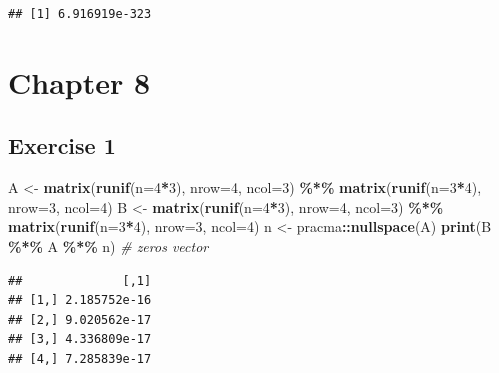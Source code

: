 \documentclass[
]{book}
\newenvironment{Shaded}{\begin{snugshade}}{\end{snugshade}}
\newcommand{\CommentTok}[1]{\textcolor[rgb]{0.56,0.35,0.01}{\textit{#1}}}
\newcommand{\DataTypeTok}[1]{\textcolor[rgb]{0.13,0.29,0.53}{#1}}
\newcommand{\DecValTok}[1]{\textcolor[rgb]{0.00,0.00,0.81}{#1}}
\newcommand{\KeywordTok}[1]{\textcolor[rgb]{0.13,0.29,0.53}{\textbf{#1}}}
\newcommand{\NormalTok}[1]{#1}
\newcommand{\OperatorTok}[1]{\textcolor[rgb]{0.81,0.36,0.00}{\textbf{#1}}}
\newcommand{\StringTok}[1]{\textcolor[rgb]{0.31,0.60,0.02}{#1}}
\begin{document}
\begin{verbatim}
## [1] 6.916919e-323
\end{verbatim}

\hypertarget{chapter-8-1}{%
\section*{Chapter 8}\label{chapter-8-1}}

\hypertarget{exercise-1-4}{%
\subsection*{Exercise 1}\label{exercise-1-4}}

\begin{Shaded}
\begin{Highlighting}[]
\NormalTok{A \textless{}{-}}\StringTok{ }\KeywordTok{matrix}\NormalTok{(}\KeywordTok{runif}\NormalTok{(}\DataTypeTok{n=}\DecValTok{4}\OperatorTok{*}\DecValTok{3}\NormalTok{), }\DataTypeTok{nrow=}\DecValTok{4}\NormalTok{, }\DataTypeTok{ncol=}\DecValTok{3}\NormalTok{) }\OperatorTok{\%*\%}\StringTok{ }\KeywordTok{matrix}\NormalTok{(}\KeywordTok{runif}\NormalTok{(}\DataTypeTok{n=}\DecValTok{3}\OperatorTok{*}\DecValTok{4}\NormalTok{), }\DataTypeTok{nrow=}\DecValTok{3}\NormalTok{, }\DataTypeTok{ncol=}\DecValTok{4}\NormalTok{)}
\NormalTok{B \textless{}{-}}\StringTok{ }\KeywordTok{matrix}\NormalTok{(}\KeywordTok{runif}\NormalTok{(}\DataTypeTok{n=}\DecValTok{4}\OperatorTok{*}\DecValTok{3}\NormalTok{), }\DataTypeTok{nrow=}\DecValTok{4}\NormalTok{, }\DataTypeTok{ncol=}\DecValTok{3}\NormalTok{) }\OperatorTok{\%*\%}\StringTok{ }\KeywordTok{matrix}\NormalTok{(}\KeywordTok{runif}\NormalTok{(}\DataTypeTok{n=}\DecValTok{3}\OperatorTok{*}\DecValTok{4}\NormalTok{), }\DataTypeTok{nrow=}\DecValTok{3}\NormalTok{, }\DataTypeTok{ncol=}\DecValTok{4}\NormalTok{)}
\NormalTok{n \textless{}{-}}\StringTok{ }\NormalTok{pracma}\OperatorTok{::}\KeywordTok{nullspace}\NormalTok{(A)}
\KeywordTok{print}\NormalTok{(B }\OperatorTok{\%*\%}\StringTok{ }\NormalTok{A }\OperatorTok{\%*\%}\StringTok{ }\NormalTok{n) }\CommentTok{\# zeros vector}
\end{Highlighting}
\end{Shaded}

\begin{verbatim}
##              [,1]
## [1,] 2.185752e-16
## [2,] 9.020562e-17
## [3,] 4.336809e-17
## [4,] 7.285839e-17
\end{verbatim}
\end{document}
